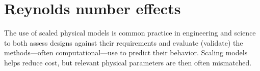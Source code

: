 \chapter{Reynolds number effects}\label{chap:Re-dep}

The use of scaled physical models is common practice in engineering and science
to both assess designs against their requirements and evaluate (validate) the
methods---often computational---use to predict their behavior. Scaling models
helps reduce cost, but relevant physical parameters are then often mismatched.
